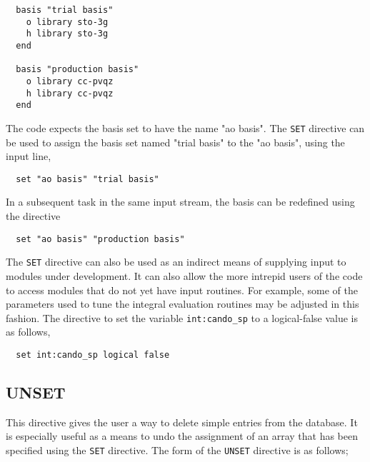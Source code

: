 \begin{verbatim}
  basis "trial basis"
    o library sto-3g
    h library sto-3g
  end

  basis "production basis"
    o library cc-pvqz
    h library cc-pvqz
  end
\end{verbatim}

The code expects the basis set to have the name "ao basis".
The \verb+SET+ directive can be used to assign the basis set named
"trial basis" to the "ao basis", using the input line,

\begin{verbatim}
  set "ao basis" "trial basis"
\end{verbatim}

In a subsequent task in the same input stream, the basis can be redefined
using the directive

\begin{verbatim}
  set "ao basis" "production basis"
\end{verbatim}

The \verb+SET+ directive can also be used as an indirect means of 
supplying input to modules under development.  It can also allow the more 
intrepid users of the code to access modules that do not yet have
input routines.  For example, some of the parameters used to tune the
integral evaluation routines may be adjusted in this fashion.  The directive 
to set the variable \verb+int:cando_sp+ to a 
logical-false value is as follows,
 
\begin{verbatim}
  set int:cando_sp logical false
\end{verbatim}

\subsection{UNSET}
\label{sec:unset}

This directive gives the user a way to delete simple entries from the
database.  It is especially useful as a  means to undo the assignment 
of an array that has been specified using the \verb+SET+ directive.  
The form of the \verb+UNSET+ directive is as follows;

